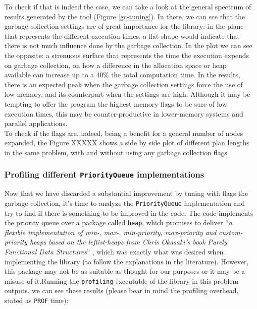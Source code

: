 To check if that is indeed the case, we can take a look at the general spectrum
of results generated by the tool (Figure \ref{gc-tuning}). In there, we can see
that the garbage collection settings are of great importance for the library:
in the plane that represents the different execution times, a flat shape would
indicate that there is not much influence done by the garbage collection. In
the plot we can see the opposite: a strenuous surface that represents the time
the execution expends on garbage collection, on how a difference in the
allocation space or heap available can increase up to a 40\% the total
computation time. In the results, there is an expected peak when the garbage
collection settings force the use of low memory, and its counterpart when the
settings are high. Although it may be tempting to offer the program the highest
memory flags to be sure of low execution times, this may be counter-productive
in lower-memory systems and parallel applications.\\

To check if the flags are, indeed, being a benefit for a general number of
nodes expanded, the Figure XXXXX shows a side by side plot of different plan
lengths in the same problem, with and without using any garbage collection
flags.


\subsubsection{Profiling different \texttt{PriorityQueue} implementations}


Now that we have discarded a substantial improvement by tuning with flags the
garbage collection, it's time to analyze the \texttt{PriorityQueue}
implementation and try to find if there is something to be improved in the
code. The code implements the priority queue over a package called
\texttt{heap}, which promises to deliver ``\textit{a flexible implementation of
  min-, max-, min-priority, max-priority and custom-priority heaps based on the
  leftist-heaps from Chris Okasaki's book Purely Functional Data Structures}''
\cite{okasaki-1999-purely}, which was exactly what was desired when
implementing the library (to follow the explanations in the literature).
However, this package may not be as suitable as thought for our purposes or it
may be a misuse of it.Running the \texttt{profiling} executable of the library
in this problem outputs, we can see these results (please bear in mind the
profiling overhead, stated as \texttt{PROF} time):\\

